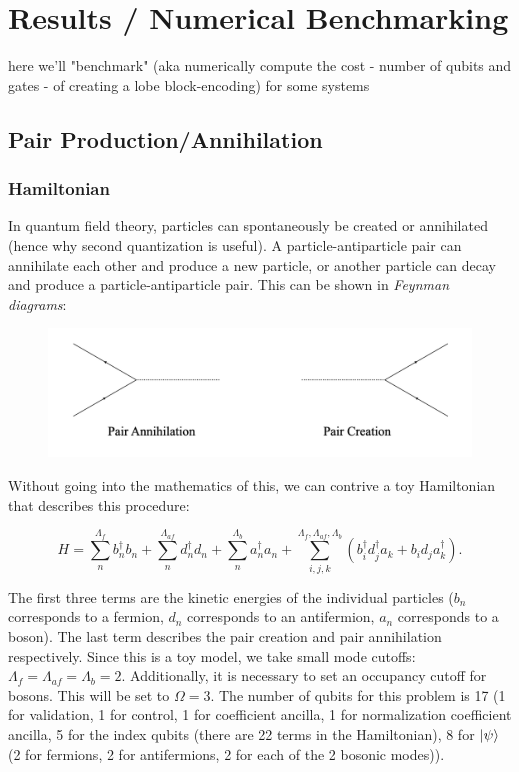 \section{Results / Numerical Benchmarking}
\label{sec:results}

here we'll "benchmark" (aka numerically compute the cost - number of qubits and gates - of creating a lobe block-encoding) for some systems

%
%
%

\subsection{Pair Production/Annihilation}
\subsubsection{Hamiltonian}
In quantum field theory, particles can spontaneously be created or annihilated (hence why second quantization is useful). A particle-antiparticle pair can annihilate each other and produce a new particle, or another particle can decay and produce a particle-antiparticle pair. This can be shown in \emph{Feynman diagrams}:

\begin{figure}[h]
    \includegraphics[width = 0.7\linewidth]{figures/creation_annihilate.png}
\end{figure}


Without going into the mathematics of this, we can contrive a toy Hamiltonian that describes this procedure:

\begin{equation}
    \label{H_pair}
    H = \sum_n^{\Lambda_{f}} b_n^\dagger b_n + \sum_n^{\Lambda_{af}} d_n^\dagger d_n + \sum_n^{\Lambda_{b}} a_n^\dagger a_n + \sum_{i,j,k}^{\Lambda_f, \Lambda_{af}, \Lambda_b} \left(b_i^\dagger d_j^\dagger a_k + b_i d_j a_k^\dagger \right).
\end{equation}

The first three terms are the kinetic energies of the individual particles ($b_n$ corresponds to a fermion, $d_n$ corresponds to an antifermion, $a_n$ corresponds to a boson). The last term describes the pair creation and pair annihilation respectively. 
Since this is a toy model, we take small mode cutoffs: $\Lambda_f = \Lambda_{af} = \Lambda_b = 2$. Additionally, it is necessary to set an occupancy cutoff for bosons. This will be set to $\Omega = 3$. The number of qubits for this problem is 17 (1 for validation, 1 for control, 1 for coefficient ancilla, 1 for normalization coefficient ancilla, 5 for the index qubits (there are 22 terms in the Hamiltonian), 8 for $\ket{\psi}$ (2 for fermions, 2 for antifermions, 2 for each of the 2 bosonic modes)).

